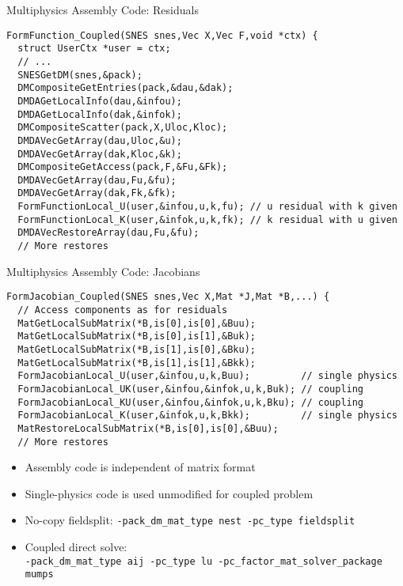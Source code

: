 \begin{frame}[fragile]{Multiphysics Assembly Code: Residuals}
\begin{verbatim}
FormFunction_Coupled(SNES snes,Vec X,Vec F,void *ctx) {
  struct UserCtx *user = ctx;
  // ...
  SNESGetDM(snes,&pack);
  DMCompositeGetEntries(pack,&dau,&dak);
  DMDAGetLocalInfo(dau,&infou);
  DMDAGetLocalInfo(dak,&infok);
  DMCompositeScatter(pack,X,Uloc,Kloc);
  DMDAVecGetArray(dau,Uloc,&u);
  DMDAVecGetArray(dak,Kloc,&k);
  DMCompositeGetAccess(pack,F,&Fu,&Fk);
  DMDAVecGetArray(dau,Fu,&fu);
  DMDAVecGetArray(dak,Fk,&fk);
  FormFunctionLocal_U(user,&infou,u,k,fu); // u residual with k given
  FormFunctionLocal_K(user,&infok,u,k,fk); // k residual with u given
  DMDAVecRestoreArray(dau,Fu,&fu);
  // More restores
\end{verbatim}
\end{frame}

\begin{frame}[fragile]{Multiphysics Assembly Code: Jacobians}
\begin{verbatim}
FormJacobian_Coupled(SNES snes,Vec X,Mat *J,Mat *B,...) {
  // Access components as for residuals
  MatGetLocalSubMatrix(*B,is[0],is[0],&Buu);
  MatGetLocalSubMatrix(*B,is[0],is[1],&Buk);
  MatGetLocalSubMatrix(*B,is[1],is[0],&Bku);
  MatGetLocalSubMatrix(*B,is[1],is[1],&Bkk);
  FormJacobianLocal_U(user,&infou,u,k,Buu);         // single physics
  FormJacobianLocal_UK(user,&infou,&infok,u,k,Buk); // coupling
  FormJacobianLocal_KU(user,&infou,&infok,u,k,Bku); // coupling
  FormJacobianLocal_K(user,&infok,u,k,Bkk);         // single physics
  MatRestoreLocalSubMatrix(*B,is[0],is[0],&Buu);
  // More restores
\end{verbatim}
\begin{itemize}
\item Assembly code is independent of matrix format
\item Single-physics code is used unmodified for coupled problem
\item No-copy fieldsplit: \verb|-pack_dm_mat_type nest -pc_type fieldsplit|
\item Coupled direct solve: \\
  {\scriptsize \verb|-pack_dm_mat_type aij -pc_type lu -pc_factor_mat_solver_package mumps|}
\end{itemize}
\end{frame}
